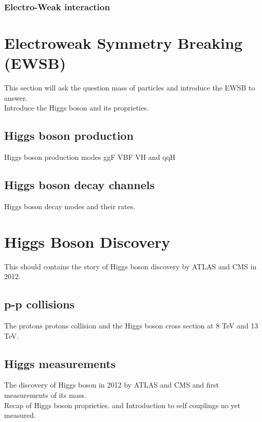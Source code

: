\subsubsection{Electro-Weak interaction}


\section{Electroweak Symmetry Breaking (EWSB)}

\label{chap1:EWSB}

This section will ask the question mass of particles and introduce the EWSB to answer.\\
Introduce the Higgs boson and its proprieties.\\

\subsection{Higgs boson production}
\label{chap1:EWSB:HP}

Higgs boson production modes ggF VBF VH and qqH

\subsection{Higgs boson decay channels}
\label{chap1:EWSB:HD}

Higgs boson decay modes and their rates.

\section{Higgs Boson Discovery}
\label{chap1:H2012}

This should contains the story of Higgs boson discovery by ATLAS and CMS in 2012.

\subsection{p-p collisions}
\label{chap1:H2012:PP}

The protons protons collision and the Higgs boson cross section at 8 TeV and 13 TeV.

\subsection{Higgs measurements}
\label{chap1:H2012:HM}

The discovery of Higgs boson in 2012 by ATLAS and CMS and first measurements of its mass.\\
Recap of Higgs boson proprieties. and Introduction to self couplings no yet measured.

